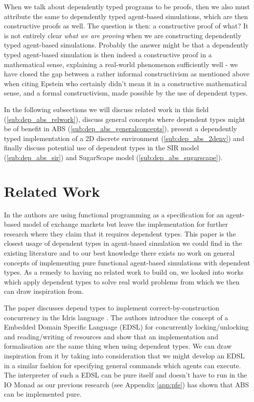 When we talk about dependently typed programs to be proofs, then we also must attribute the same to dependently typed agent-based simulations, which are then constructive proofs as well. The question is then: a constructive proof of what? It is not entirely clear \textit{what we are proving} when we are constructing dependently typed agent-based simulations. Probably the answer might be that a dependently typed agent-based simulation is then indeed a constructive proof in a mathematical sense, explaining a real-world phenomenon sufficiently well - we have closed the gap between a rather informal constructivism as mentioned above when citing Epstein who certainly didn't mean it in a constructive mathematical sense, and a formal constructivism, made possible by the use of dependent types.

In the following subsections we will discuss related work in this field (\ref{sub:dep_abs_relwork}), discuss general concepts where dependent types might be of benefit in ABS (\ref{sub:dep_abs_generalconcepts}), present a dependently typed implementation of a 2D discrete environment (\ref{sub:dep_abs_2denv}) and finally discuss potential use of dependent types in the SIR model (\ref{sub:dep_abs_sir}) and SugarScape model (\ref{sub:dep_abs_sugarscape}).

\section{Related Work}
\label{sec:dep_abs_relwork}
In \cite{botta_functional_2011} the authors are using functional programming as a specification for an agent-based model of exchange markets but leave the implementation for further research where they claim that it requires dependent types. This paper is the closest usage of dependent types in agent-based simulation we could find in the existing literature and to our best knowledge there exists no work on general concepts of implementing pure functional agent-based simulations with dependent types. As a remedy to having no related work to build on, we looked into works which apply dependent types to solve real world problems from which we then can draw inspiration from. 

The paper \cite{brady_correct-by-construction_2010} discusses depend types to implement correct-by-construction concurrency in the Idris language \cite{brady_idris_2013}. The authors introduce the concept of a Embedded Domain Specific Language (EDSL) for concurrently locking/unlocking and reading/writing of resources and show that an implementation and formalisation are the same thing when using dependent types. We can draw inspiration from it by taking into consideration that we might develop an EDSL in a similar fashion for specifying general commands which agents can execute. The interpreter of such a EDSL can be pure itself and doesn't have to run in the IO Monad as our previous research (see Appendix \ref{app:pfe}) has shown that ABS can be implemented pure.

